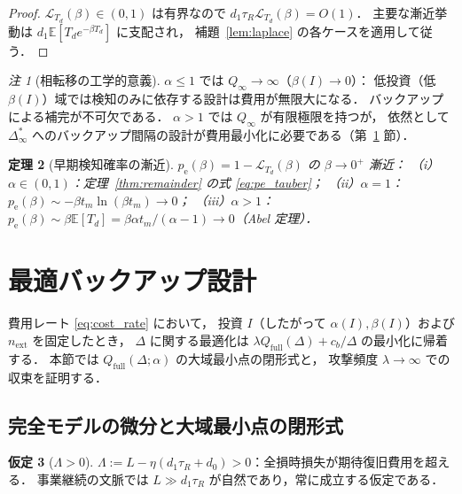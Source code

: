 \documentclass[12pt,a4paper]{article}
\theoremstyle{plain}
\newtheorem{theorem}{定理}[section]
\theoremstyle{definition}
\newtheorem{assumption}[theorem]{仮定}
\theoremstyle{remark}
\newtheorem{remark}[theorem]{注}
\newcommand{\E}{\mathbb{E}}
\newcommand{\calL}{\mathcal{L}}
\newcommand{\pe}{p_{\mathrm{e}}}
\newcommand{\Qf}{Q_{\mathrm{full}}}
\newcommand{\Qinf}{Q_{\infty}}
\newcommand{\betaI}{\beta(I)}
\newcommand{\Dinf}{\Delta^{*}_{\infty}}
\newcommand{\La}{\Lambda}
\begin{document}
\begin{proof}
$\calL_{T_d}(\beta)\in(0,1)$ は有界なので $d_1\tau_R\calL_{T_d}(\beta)=O(1)$．
主要な漸近挙動は $d_1\E[T_d e^{-\beta T_d}]$ に支配され，
補題~\ref{lem:laplace} の各ケースを適用して従う．
\end{proof}

\begin{remark}[相転移の工学的意義]\label{rem:phase}
$\alpha\le1$ では $\Qinf\to\infty$（$\betaI\to0$）：
低投資（低 $\betaI$）域では検知のみに依存する設計は費用が無限大になる．
バックアップによる補完が不可欠である．
$\alpha>1$ では $\Qinf$ が有限極限を持つが，
依然として $\Dinf$ へのバックアップ間隔の設計が費用最小化に必要である（第~\ref{sec:opt} 節）．
\end{remark}

\begin{theorem}[早期検知確率の漸近]\label{thm:pe_asym}
$\pe(\beta)=1-\calL_{T_d}(\beta)$ の $\beta\to0^+$ 漸近：
（i）$\alpha\in(0,1)$：定理~\ref{thm:remainder} の式 \eqref{eq:pe_tauber}；
（ii）$\alpha=1$：$\pe(\beta)\sim-\beta t_m\ln(\beta t_m)\to0$；
（iii）$\alpha>1$：$\pe(\beta)\sim\beta\E[T_d]=\beta\alpha t_m/(\alpha-1)\to0$（Abel 定理）．
\end{theorem}

\section{最適バックアップ設計}
\label{sec:opt}

費用レート \eqref{eq:cost_rate} において，
投資 $I$（したがって $\alpha(I),\beta(I)$）および $n_{\mathrm{ext}}$ を固定したとき，
$\Delta$ に関する最適化は $\lambda\Qf(\Delta)+c_b/\Delta$ の最小化に帰着する．
本節では $\Qf(\Delta;\alpha)$ の大域最小点の閉形式と，
攻撃頻度 $\lambda\to\infty$ での収束を証明する．

\subsection{完全モデルの微分と大域最小点の閉形式}

\begin{assumption}[$\La>0$]\label{ass:Lambda}
$\La:=L-\eta(d_1\tau_R+d_0)>0$：全損時損失が期待復旧費用を超える．
事業継続の文脈では $L\gg d_1\tau_R$ が自然であり，常に成立する仮定である．
\end{assumption}
\end{document}
